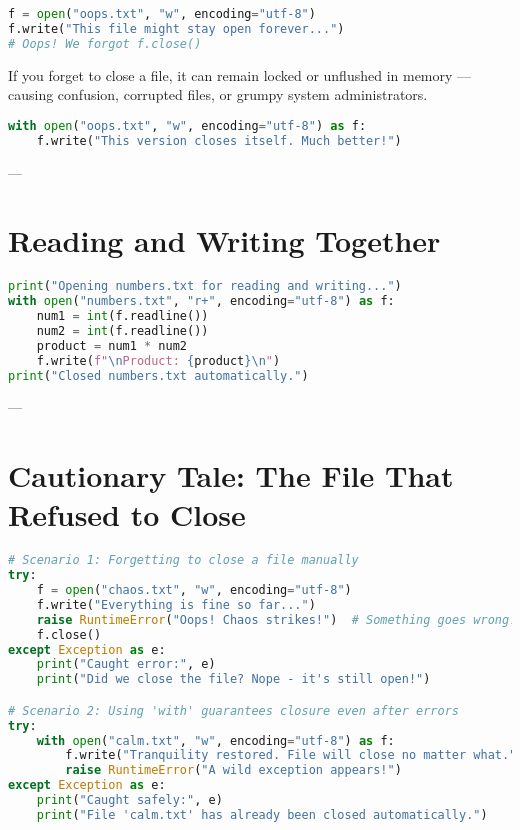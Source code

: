 \begin{lstlisting}[language=Python, caption={Manual open and close -- easy to forget.}]
f = open("oops.txt", "w", encoding="utf-8")
f.write("This file might stay open forever...")
# Oops! We forgot f.close()
\end{lstlisting}

\noindent
If you forget to close a file, it can remain locked or unflushed in memory —  
causing confusion, corrupted files, or grumpy system administrators.  

\begin{lstlisting}[language=Python, caption={Fixed using a with statement.}]
with open("oops.txt", "w", encoding="utf-8") as f:
    f.write("This version closes itself. Much better!")
\end{lstlisting}

---

\section{Reading and Writing Together}

\begin{lstlisting}[language=Python, caption={Using the same file object for reading and writing.}]
print("Opening numbers.txt for reading and writing...")
with open("numbers.txt", "r+", encoding="utf-8") as f:
    num1 = int(f.readline())
    num2 = int(f.readline())
    product = num1 * num2
    f.write(f"\nProduct: {product}\n")
print("Closed numbers.txt automatically.")
\end{lstlisting}

---

\section{Cautionary Tale: The File That Refused to Close}

\begin{lstlisting}[language=Python, caption={Why using `with` is safer.}]
# Scenario 1: Forgetting to close a file manually
try:
    f = open("chaos.txt", "w", encoding="utf-8")
    f.write("Everything is fine so far...")
    raise RuntimeError("Oops! Chaos strikes!")  # Something goes wrong!
    f.close()
except Exception as e:
    print("Caught error:", e)
    print("Did we close the file? Nope - it's still open!")

# Scenario 2: Using 'with' guarantees closure even after errors
try:
    with open("calm.txt", "w", encoding="utf-8") as f:
        f.write("Tranquility restored. File will close no matter what.")
        raise RuntimeError("A wild exception appears!")
except Exception as e:
    print("Caught safely:", e)
    print("File 'calm.txt' has already been closed automatically.")
\end{lstlisting}


